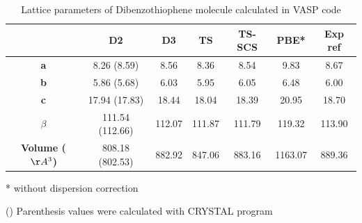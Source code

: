  	
 	\begin{table}[H]
 		\caption{Lattice parameters of Dibenzothiophene molecule calculated in VASP code} \label{table-dibenzothiophenesol}
 		\begin{center}
 			\begin{threeparttable}
 				\begin{tabular}{c c c c c c c}
 					\toprule
 					& \textbf{D2} & \textbf{D3} & \textbf{TS} & \textbf{TS-SCS} & \textbf{PBE*} & \textbf{Exp} ref\cite{schaffrin1970structure}\\
 					\midrule
 					\textbf{a} &  8.26 (8.59) & 8.56 & 8.36 & 8.54 & 9.83 & 8.67\\
 					\textbf{b}&5.86 (5.68)  & 6.03 & 5.95 & 6.05 & 6.48 & 6.00\\
 					\textbf{c}& 17.94 (17.83) & 18.44 & 18.04 & 18.39 & 20.95 & 18.70\\
 					\textbf{$\beta$} & 111.54 (112.66) & 112.07 & 111.87& 111.79& 119.32 & 113.90 \\
 					\textbf{Volume ($\AA^{3}$)}&808.18 (802.53) &882.92 &847.06  & 883.16 & 1163.07 & 889.36\\
 					\bottomrule
 				\end{tabular}
 				
 				\begin{tablenotes}
 					\item[*] without dispersion correction
 					\item[()] Parenthesis values were calculated with CRYSTAL program
 				\end{tablenotes}
 			\end{threeparttable}
 		\end{center}
 	\end{table}
 
